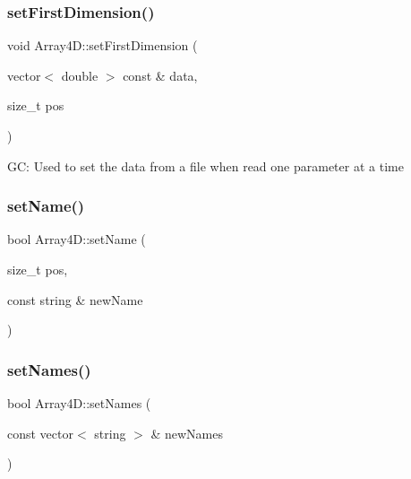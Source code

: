 \mbox{\label{class_array4_d_a05273ec7b80fb8eb738dfcf74a54ab5f}} 
\subsubsection{\texorpdfstring{set\+First\+Dimension()}{setFirstDimension()}}
{\footnotesize\ttfamily void Array4\+D\+::set\+First\+Dimension (\begin{DoxyParamCaption}\item[{vector$<$ double $>$ const \&}]{data,  }\item[{size\+\_\+t}]{pos }\end{DoxyParamCaption})}

GC\+: Used to set the data from a file when read one parameter at a time \mbox{\label{class_array4_d_aebbb2b6bc7d699ebe405852509001c9d}} 
\subsubsection{\texorpdfstring{set\+Name()}{setName()}}
{\footnotesize\ttfamily bool Array4\+D\+::set\+Name (\begin{DoxyParamCaption}\item[{size\+\_\+t}]{pos,  }\item[{const string \&}]{new\+Name }\end{DoxyParamCaption})}

\mbox{\label{class_array4_d_af68fe1f08ec29e4f9a14df33a551457f}} 
\subsubsection{\texorpdfstring{set\+Names()}{setNames()}}
{\footnotesize\ttfamily bool Array4\+D\+::set\+Names (\begin{DoxyParamCaption}\item[{const vector$<$ string $>$ \&}]{new\+Names }\end{DoxyParamCaption})}

\mbox{\label{class_array4_d_ac6d1282e0d765748c192a72d60274853}} 
